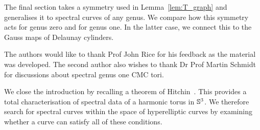 \documentclass{article}
\begin{document}
The final section takes a symmetry used in Lemma~\ref{lem:T_graph} and generalises it to spectral curves of any genus. We compare how this symmetry acts for genus zero and for genus one. In the latter case, we connect this to the Gauss maps of Delaunay cylinders.

The authors would like to thank Prof John Rice for his feedback as the material was developed. The second author also wishes to thank Dr Prof Martin Schmidt for discussions about spectral genus one CMC tori.

We close the introduction by recalling a theorem of Hitchin~\cite[Theorem~8.1]{Hitchin1990}. This provides a total characterisation of spectral data of a harmonic torus in $\S^3$. We therefore search for spectral curves within the space of hyperelliptic curves by examining whether a curve can satisfy all of these conditions.
\end{document}
